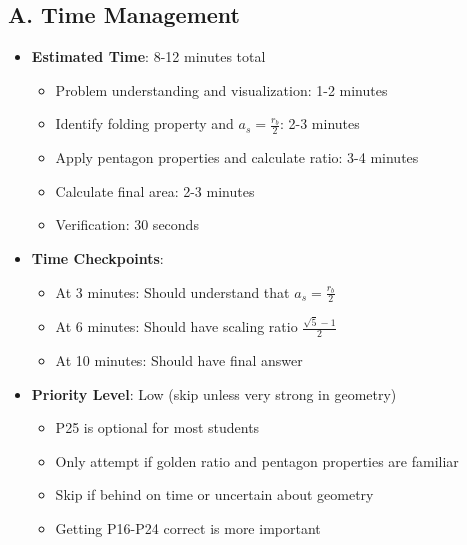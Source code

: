 \documentclass[12pt]{article}
\begin{document}
\begin{competitionbox}
\subsection*{A. Time Management}
\begin{itemize}[leftmargin=*]
    \item \textbf{Estimated Time}: 8-12 minutes total
    \begin{itemize}
        \item Problem understanding and visualization: 1-2 minutes
        \item Identify folding property and $a_s = \frac{r_b}{2}$: 2-3 minutes
        \item Apply pentagon properties and calculate ratio: 3-4 minutes
        \item Calculate final area: 2-3 minutes
        \item Verification: 30 seconds
    \end{itemize}
    \item \textbf{Time Checkpoints}: 
    \begin{itemize}
        \item At 3 minutes: Should understand that $a_s = \frac{r_b}{2}$
        \item At 6 minutes: Should have scaling ratio $\frac{\sqrt{5}-1}{2}$
        \item At 10 minutes: Should have final answer
    \end{itemize}
    \item \textbf{Priority Level}: Low (skip unless very strong in geometry)
    \begin{itemize}
        \item P25 is optional for most students
        \item Only attempt if golden ratio and pentagon properties are familiar
        \item Skip if behind on time or uncertain about geometry
        \item Getting P16-P24 correct is more important
    \end{itemize}
\end{itemize}


\end{competitionbox}
\end{document}
